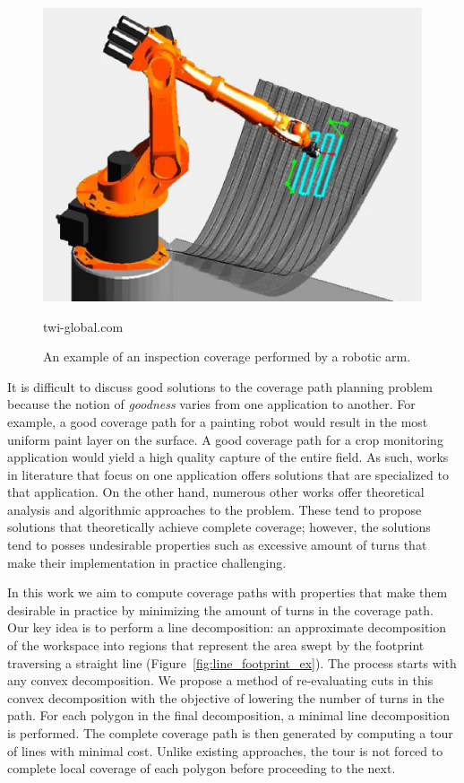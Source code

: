 \documentclass[../main.tex]{subfiles}
\begin{document}
\begin{figure}
	\centering
	\includegraphics[scale=0.5]{img/chapter_1/example_coverage.eps}
	\vskip-15pt
	\caption*{\tiny twi-global.com}
	\caption{An example of an inspection coverage performed by a robotic arm.}
	\label{img:example_coverage}
\end{figure}

It is difficult to discuss good solutions to the coverage path planning problem because the notion of \emph{goodness} varies from one application to another. For example, a good coverage path for a painting robot would result in the most uniform paint layer on the surface. A good coverage path for a crop monitoring application would yield a high quality capture of the entire field. As such, works in literature that focus on one application offers solutions that are specialized to that application. On the other hand, numerous other works offer theoretical analysis and algorithmic approaches to the problem. These tend to propose solutions that theoretically achieve complete coverage; however, the solutions tend to posses undesirable properties such as excessive amount of turns that make their implementation in practice challenging.

In this work we aim to compute coverage paths with properties that make them desirable in practice by minimizing the amount of turns in the coverage path. Our key idea is to perform a line decomposition: an approximate decomposition of the workspace into regions that represent the area swept by the footprint traversing a straight line (Figure~\ref{fig:line_footprint_ex}). The process starts with any convex decomposition. We propose a method of re-evaluating cuts in this convex decomposition with the objective of lowering the number of turns in the path. For each polygon in the final decomposition, a minimal line decomposition is performed. The complete coverage path is then generated by computing a tour of lines with minimal cost. Unlike existing approaches, the tour is not forced to complete local coverage of each polygon before proceeding to the next.
\end{document}
